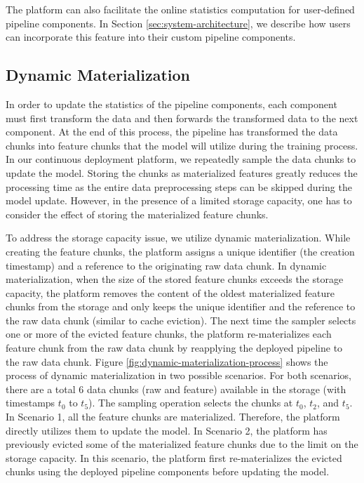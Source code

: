 The platform can also facilitate the online statistics computation for user-defined pipeline components.
In Section \ref{sec:system-architecture}, we describe how users can incorporate this feature into their custom pipeline components.

\subsection{Dynamic Materialization}\label{subsec:dynamic-materialization}
In order to update the statistics of the pipeline components, each component must first transform the data and then forwards the transformed data to the next component.
At the end of this process, the pipeline has transformed the data chunks into feature chunks that the model will utilize during the training process.
In our continuous deployment platform, we repeatedly sample the data chunks to update the model.
Storing the chunks as materialized features greatly reduces the processing time as the entire data preprocessing steps can be skipped during the model update.
However, in the presence of a limited storage capacity, one has to consider the effect of storing the materialized feature chunks.

To address the storage capacity issue, we utilize dynamic materialization.
While creating the feature chunks, the platform assigns a unique identifier (the creation timestamp) and a reference to the originating raw data chunk.
In dynamic materialization, when the size of the stored feature chunks exceeds the storage capacity, the platform removes the content of the oldest materialized feature chunks from the storage and only keeps the unique identifier and the reference to the raw data chunk (similar to cache eviction).
The next time the sampler selects one or more of the evicted feature chunks, the platform re-materializes each feature chunk from the raw data chunk by reapplying the deployed pipeline to the raw data chunk.
Figure \ref{fig:dynamic-materialization-process} shows the process of dynamic materialization in two possible scenarios.
For both scenarios, there are a total 6 data chunks (raw and feature) available in the storage (with timestamps $t_0$ to $t_5$).
The sampling operation selects the chunks at $t_0$, $t_2$, and $t_5$.
In Scenario 1, all the feature chunks are materialized.
Therefore, the platform directly utilizes them to update the model.
In Scenario 2, the platform has previously evicted some of the materialized feature chunks due to the limit on the storage capacity.
In this scenario, the platform first re-materializes the evicted chunks using the deployed pipeline components before updating the model.

